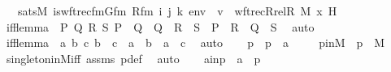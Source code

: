 \begin{isabellebody}
\isanewline
\ \ \ {\isachardoublequoteopen}sats{\isacharparenleft}{\kern0pt}M{\isacharcomma}{\kern0pt}\ is{\isacharunderscore}{\kern0pt}wftrec{\isacharunderscore}{\kern0pt}fm{\isacharparenleft}{\kern0pt}Gfm{\isacharcomma}{\kern0pt}\ Rfm{\isacharcomma}{\kern0pt}\ i{\isacharcomma}{\kern0pt}\ j{\isacharcomma}{\kern0pt}\ k{\isacharparenright}{\kern0pt}{\isacharcomma}{\kern0pt}\ env{\isacharparenright}{\kern0pt}\ {\isasymlongleftrightarrow}\ v\ {\isacharequal}{\kern0pt}\ wftrec{\isacharparenleft}{\kern0pt}Rrel{\isacharparenleft}{\kern0pt}R{\isacharcomma}{\kern0pt}\ M{\isacharparenright}{\kern0pt}{\isacharcomma}{\kern0pt}\ x{\isacharcomma}{\kern0pt}\ H{\isacharparenright}{\kern0pt}{\isachardoublequoteclose}\ \isanewline
%
\isadelimproof
%
\endisadelimproof
%
\isatagproof
{}\isamarkupfalse%
\ {\isacharminus}{\kern0pt}\ \isanewline
\isanewline
\ \ \isamarkupfalse%
\ iff{\isacharunderscore}{\kern0pt}lemma{}\ {\isacharcolon}{\kern0pt}\ {\isachardoublequoteopen}{\isasymAnd}P\ Q\ R\ S{\isachardot}{\kern0pt}\ P\ {\isasymlongleftrightarrow}\ Q\ {\isasymLongrightarrow}\ {\isacharparenleft}{\kern0pt}Q\ {\isasymLongrightarrow}\ R\ {\isasymlongleftrightarrow}\ S{\isacharparenright}{\kern0pt}\ {\isasymLongrightarrow}\ {\isacharparenleft}{\kern0pt}P\ {\isasymand}\ R\ {\isasymlongleftrightarrow}\ Q\ {\isasymand}\ S{\isacharparenright}{\kern0pt}{\isachardoublequoteclose}\ \isamarkupfalse%
\ auto\ \isanewline
\ \ \isamarkupfalse%
\ iff{\isacharunderscore}{\kern0pt}lemma{}\ {\isacharcolon}{\kern0pt}\ {\isachardoublequoteopen}{\isasymAnd}a\ b\ c{\isachardot}{\kern0pt}\ b\ {\isacharequal}{\kern0pt}\ c\ {\isasymLongrightarrow}\ a\ {\isacharequal}{\kern0pt}\ b\ {\isasymlongleftrightarrow}\ a\ {\isacharequal}{\kern0pt}\ c{\isachardoublequoteclose}\ \isamarkupfalse%
\ auto\isanewline
\isanewline
\ \ \isamarkupfalse%
\ p\ \ {\isachardoublequoteopen}p\ {\isasymequiv}\ {\isacharbraceleft}{\kern0pt}a{\isacharbraceright}{\kern0pt}{\isachardoublequoteclose}\ \isanewline
\ \ \isamarkupfalse%
\ pinM\ {\isacharcolon}{\kern0pt}\ {\isachardoublequoteopen}p\ {\isasymin}\ M{\isachardoublequoteclose}\ \isamarkupfalse%
\ singleton{\isacharunderscore}{\kern0pt}in{\isacharunderscore}{\kern0pt}M{\isacharunderscore}{\kern0pt}iff\ assms\ p{\isacharunderscore}{\kern0pt}def\ \isamarkupfalse%
\ auto\isanewline
\ \ \isamarkupfalse%
\ ainp\ {\isacharcolon}{\kern0pt}\ {\isachardoublequoteopen}a\ {\isasymin}\ p{\isachardoublequoteclose}\ \isamarkupfalse%

\end{isabellebody}
